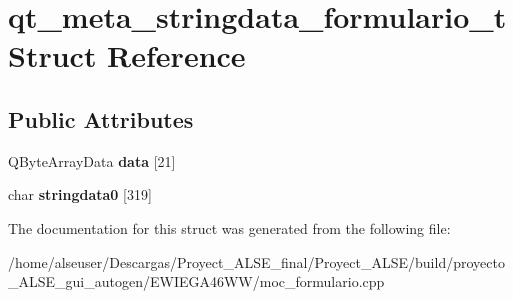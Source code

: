 \hypertarget{structqt__meta__stringdata__formulario__t}{}\section{qt\+\_\+meta\+\_\+stringdata\+\_\+formulario\+\_\+t Struct Reference}
\label{structqt__meta__stringdata__formulario__t}
\subsection*{Public Attributes}
\begin{DoxyCompactItemize}
\item 
\mbox{\label{structqt__meta__stringdata__formulario__t_a16064cc2d54827c3ccad21ef7e5f33cb}} 
Q\+Byte\+Array\+Data {\bfseries data} \mbox{[}21\mbox{]}
\item 
\mbox{\label{structqt__meta__stringdata__formulario__t_a69f9ddfd6de21fe6e0fe7e5869e622a9}} 
char {\bfseries stringdata0} \mbox{[}319\mbox{]}
\end{DoxyCompactItemize}


The documentation for this struct was generated from the following file\+:\begin{DoxyCompactItemize}
\item 
/home/alseuser/\+Descargas/\+Proyect\+\_\+\+A\+L\+S\+E\+\_\+final/\+Proyect\+\_\+\+A\+L\+S\+E/build/proyecto\+\_\+\+A\+L\+S\+E\+\_\+gui\+\_\+autogen/\+E\+W\+I\+E\+G\+A46\+W\+W/moc\+\_\+formulario.\+cpp\end{DoxyCompactItemize}
